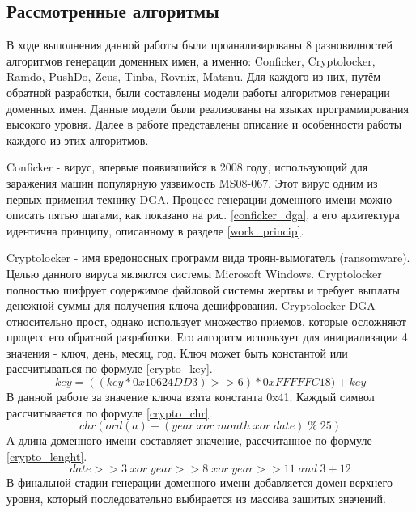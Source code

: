     \subsection{Рассмотренные алгоритмы}\label{dga_teor}
    В ходе выполнения данной работы были проанализированы 8 разновидностей алгоритмов генерации доменных имен, а именно: Conficker, Cryptolocker, Ramdo, PushDo, Zeus, Tinba, Rovnix, Matsnu. Для каждого из них, путём обратной разработки, были составлены модели работы алгоритмов генерации доменных имен. Данные модели были реализованы на языках программирования высокого уровня. Далее в работе представлены описание и особенности работы каждого из этих алгоритмов.

Conficker - вирус, впервые появившийся в 2008 году, использующий для заражения машин популярную уязвимость MS08-067. Этот вирус одним из первых применил технику DGA. Процесс генерации доменного имени можно описать пятью шагами, как показано на рис. \ref{conficker_dga}, а его архитектура идентична принципу, описанному в разделе \ref{work_princip}.

Cryptolocker - имя вредоносных программ вида троян-вымогатель (ransomware). Целью данного вируса являются системы Microsoft Windows. Cryptolocker полностью шифрует содержимое файловой системы жертвы и требует выплаты денежной суммы для получения ключа дешифрования. Cryptolocker DGA относительно прост, однако использует множество приемов, которые осложняют процесс его обратной разработки. Его алгоритм использует для инициализации 4 значения - ключ, день, месяц, год.
Ключ может быть константой или рассчитываться по формуле \ref{crypto_key}.
\begin{equation}\label{crypto_key}
key = ((key * 0x10624DD3) >> 6) * 0xFFFFFC18)+ key
\end{equation}
В данной работе за значение ключа взята константа 0x41.
Каждый символ рассчитывается по формуле \ref{crypto_chr}.
\begin{equation}\label{crypto_chr}
chr(ord(a) + (year \; xor \; month\; xor \;date) \;\% \;25)
\end{equation}
А длина доменного имени составляет значение, рассчитанное по формуле \ref{crypto_lenght}.
\begin{equation}\label{crypto_lenght}
date>>3 \; xor \; year>>8 \; xor  \;year>>11 \; and \; 3 + 12
\end{equation}
В финальной стадии генерации доменного имени добавляется домен верхнего уровня, который последовательно выбирается из массива зашитых значений.

